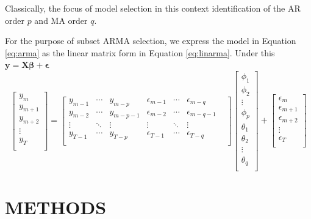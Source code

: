  Classically, the focus of model selection in this context identification of the AR order $p$ and MA order $q$.

For the purpose of subset ARMA selection, we express the model in Equation \ref{eq:arma} as the linear matrix form in Equation \ref{eq:linarma}. Under this $\bm{y}=\bm{X}\bm{\beta}+\bm{\epsilon}$
\begin{equation}
	\label{eq:linarma}
	\begin{bmatrix} y_m\\y_{m+1}\\y_{m+2}\\ \vdots\\ y_T\\ \end{bmatrix} =
	\begin{bmatrix} y_{m-1} & \cdots & y_{m-p} &
					\epsilon_{m-1} & \cdots & \epsilon_{m-q} \\
					y_{m-2} & \cdots & y_{m-p-1} &
					\epsilon_{m-2} & \cdots & \epsilon_{m-q-1} \\
					\vdots & \ddots & \vdots &
					\vdots & \ddots & \vdots & \\
					y_{T-1} & \cdots & y_{T-p} &
					\epsilon_{T-1} & \cdots & \epsilon_{T-q} \\
	\end{bmatrix}
	\begin{bmatrix} \phi_1\\ \phi_2\\ \vdots\\ \phi_p\\ \theta_1 \\
  						\theta_2\\ \vdots	\\ \theta_q\\ \end{bmatrix} +
  	\begin{bmatrix} \epsilon_m\\ \epsilon_{m+1}\\ \epsilon_{m+2}\\ \vdots\\ \epsilon_T\\ \end{bmatrix}
\end{equation}




\cite{Chen2011} 


\section{METHODS}

